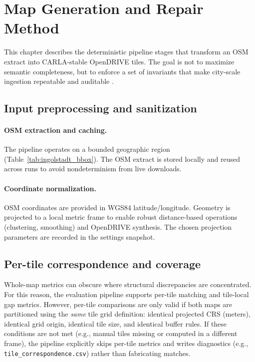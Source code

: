 \section{Map Generation and Repair Method}
\label{sec:generation_method}

This chapter describes the deterministic pipeline stages that transform an OSM extract into CARLA-stable OpenDRIVE tiles. The goal is not to maximize semantic completeness, but to enforce a set of invariants that make city-scale ingestion repeatable and auditable \cite{asam_opendrive_181,carla_opendrive_standalone}.

\subsection{Input preprocessing and sanitization}
\paragraph{OSM extraction and caching.}
The pipeline operates on a bounded geographic region (Table~\ref{tab:ingolstadt_bbox}). The OSM extract is stored locally and reused across runs to avoid nondeterminism from live downloads.

\paragraph{Coordinate normalization.}
OSM coordinates are provided in WGS84 latitude/longitude. Geometry is projected to a local metric frame to enable robust distance-based operations (clustering, smoothing) and OpenDRIVE synthesis. The chosen projection parameters are recorded in the settings snapshot.



\subsection{Per-tile correspondence and coverage}
\label{sec:tile_correspondence_overview}
Whole-map metrics can obscure where structural discrepancies are concentrated.
For this reason, the evaluation pipeline supports per-tile matching and tile-local gap metrics.
However, per-tile comparisons are only valid if both maps are partitioned using the \emph{same} tile grid definition: identical projected CRS (meters), identical grid origin, identical tile size, and identical buffer rules.
If these conditions are not met (e.g., manual tiles missing or computed in a different frame), the pipeline explicitly skips per-tile metrics and writes diagnostics (e.g., \texttt{tile\_correspondence.csv}) rather than fabricating matches.

